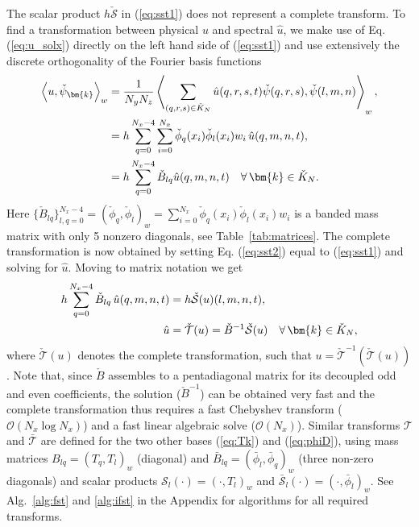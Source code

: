 \documentclass[preprint]{elsarticle}
\newcommand{\N}[1]{\check{#1}}
\newcommand{\D}[1]{\bar{#1}}
\begin{document}
The scalar product  $h\N{\mathcal{S}}$ in (\ref{eq:sst1}) does not represent a 
complete transform. To find a transformation between physical $u$ and spectral 
$\hat{u}$, we make use of Eq. (\ref{eq:u_solx}) directly on the left hand side of (\ref{eq:sst1}) and use extensively the discrete 
orthogonality of the Fourier basis functions
\begin{align}
\left<u, \N{\psi}_{\bm{k}}\right>_w &= \frac{1}{N_yN_z}\left< 
\sum_{(q,r,s) \in \N{K}_N} \hat{u}(q,r,s,t) \N{\psi}(q,r,s), 
\N{\psi}(l,m,n) \right>_w, \notag \\
           &= h \sum_{q=0}^{N_x-4} \sum_{i=0}^{N_x} \N{\phi}_{q}(x_i) 
           \N{\phi}_{l}(x_i) w_i \, \hat{u}(q, {m}, {n}, t), \notag \\
           &= h \sum_{q=0}^{N_x-4} \N{B}_{lq} \hat{u}(q, {m}, {n}, t) \quad \forall \, \bm{k} \in \N{K}_N. 
           \label{eq:sst2}
\end{align}
Here $\{\N{B}_{lq}\}_{l,q=0}^{N_x-4} = (\N{\phi}_q, \N{\phi}_l)_w = 
\sum_{i=0}^{N_x} \N{\phi}_{q}(x_i) \N{\phi}_{l}(x_i) w_i$ is a 
banded mass matrix with only 5 nonzero diagonals, see Table~\ref{tab:matrices}. The complete transformation is now obtained by 
setting Eq. (\ref{eq:sst2}) equal to (\ref{eq:sst1}) and solving for $\hat{u}$. 
Moving to matrix notation we get
\begin{align}
h\sum_{q=0}^{N_x-4} \N{B}_{lq}\, \hat{u}(q, {m}, {n}, t) &= 
h\N{\mathcal{S}}(u)(l, m, n, t), \notag \\
 \hat{u} &= \N{\mathcal{T}}(u) =  \N{B}^{-1}\N{\mathcal{S}}(u) 
 \quad \forall \, \bm{k} \in \N{K}_N, \label{eq:fstB}
\end{align}
where $\N{\mathcal{T}}(u)$ denotes the complete transformation, such that $u = 
\N{\mathcal{T}}^{-1}(\N{\mathcal{T}}(u))$. Note that, since $\N{B}$ assembles to 
a pentadiagonal matrix for its decoupled odd and even coefficients, the solution ($\N{B}^{-1}$) can be obtained very fast and the complete 
transformation thus requires a fast Chebyshev transform ($\mathcal{O}(N_x \log N_x)$) and 
a fast linear algebraic solve ($\mathcal{O}(N_x)$). Similar transforms $\mathcal{T}$ 
and $\D{\mathcal{T}}$ are defined for the two other bases (\ref{eq:Tk}) and 
(\ref{eq:phiD}), using mass matrices $B_{lq}=(T_q, T_l)_w$ (diagonal) and 
$\D{B}_{lq}=(\D{\phi}_l, \D{\phi}_q)_w$ (three non-zero diagonals) and scalar products 
$\mathcal{S}_l(\cdot) = (\cdot, T_l)_w$ and $\D{\mathcal{S}}_l(\cdot) = (\cdot, 
\D{\phi}_l)_w$. See Alg.~\ref{alg:fst} and \ref{alg:ifst} in the Appendix for algorithms for all required transforms.
\end{document}

